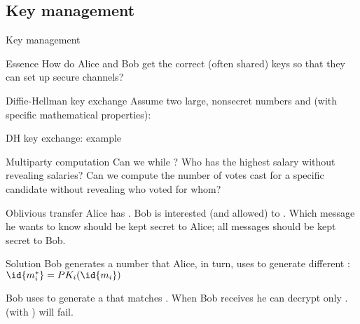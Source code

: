 \subsection{Key management}
\begin{slide}{Key management}
  \begin{block}{Essence}
    How do Alice and Bob get the correct (often shared) keys so that they can set up secure channels?
  \end{block}

  \begin{block}{Diffie-Hellman key exchange}
    Assume two large, nonsecret numbers  and  (with specific mathematical properties):
    \begin{centerfig}
    \end{centerfig}
  \end{block}
  
\end{slide}
  \begin{slide}{DH key exchange: example}
    \begin{block}{Multiparty computation}
      Can we  while ? Who has the highest salary without
      revealing salaries? Can we compute the number of votes cast for a specific candidate without revealing
      who voted for whom?
    \end{block}

    \begin{alertblock}{Oblivious transfer}
      Alice has   . Bob is interested
      (and allowed) to  . Which message he wants to know should be kept secret
      to Alice; all messages  should be kept secret to Bob.
    \end{alertblock}

    \begin{alertblock}{Solution}
      Bob generates a number  that Alice, in turn, uses to generate  different
      :
      \(
      \id{m^*_i} = {PK_i}(\id{m_i})
      \)
      
      Bob uses  to generate a  that matches 
      . When Bob receives  he can decrypt only
      .  (with ) will fail.
    \end{alertblock}
  \end{slide}
